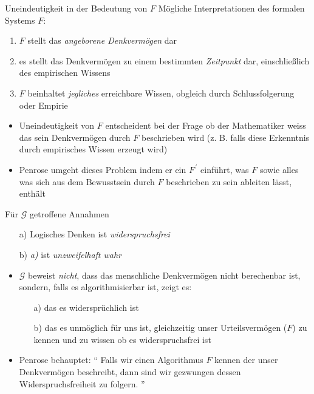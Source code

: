 \begin{frame}
    \begin{block}{Uneindeutigkeit in der Bedeutung von $F$}
        Mögliche Interpretationen des formalen Systems $F$:
        \begin{enumerate}
            \item $F$ stellt das \emph{angeborene Denkvermögen} dar
            \item es stellt das Denkvermögen zu einem bestimmten \emph{Zeitpunkt} dar, einschließlich des empirischen Wissens
            \item $F$ beinhaltet \emph{jegliches} erreichbare Wissen, obgleich durch Schlussfolgerung oder Empirie
        \end{enumerate}
    \end{block}
    \begin{itemize}
        \item Uneindeutigkeit von $F$ entscheident bei der Frage ob der Mathematiker weiss das sein Denkvermögen durch $F$ beschrieben wird (z. B. falls diese Erkenntnis durch empirisches Wissen erzeugt wird)
        \item Penrose umgeht dieses Problem indem er ein $F^{\,'}$ einführt, was $F$ sowie alles was sich aus dem Bewusstsein durch $F$ beschrieben zu sein ableiten lässt, enthält
    \end{itemize}
\end{frame}

\begin{frame}
    \begin{block}{Für $\mathscr{G}$ getroffene Annahmen}
        \begin{itemize}
            \item[a)] Logisches Denken ist \emph{widerspruchsfrei}
            \item[b)] \emph{a)} ist \emph{unzweifelhaft wahr}
        \end{itemize}
    \end{block}
    \begin{itemize}
        \item $\mathscr{G}$ beweist \emph{nicht}, dass das menschliche Denkvermögen nicht berechenbar ist, sondern, falls es algorithmisierbar ist, zeigt es:
        \begin{itemize}
            \item[a)] das es widersprüchlich ist
            \item[b)] das es unmöglich für uns ist, gleichzeitig unser Urteilsvermögen ($F$) zu kennen und zu wissen ob es widerspruchsfrei ist
        \end{itemize}
        \item Penrose behauptet:
        \enquote{
            Falls wir einen Algorithmus $F$ kennen der unser Denkvermögen beschreibt, dann sind wir gezwungen dessen Widerspruchsfreiheit zu folgern.
        }
    \end{itemize}
\end{frame}

